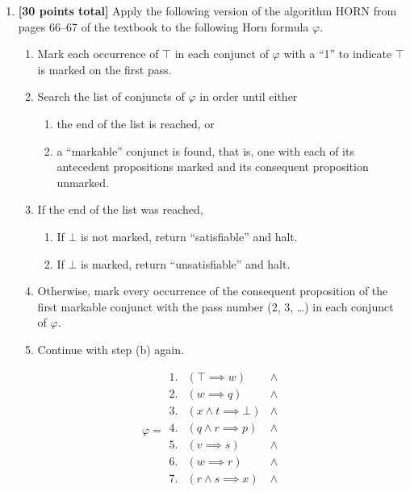 \documentclass{article}
\begin{document}
\begin{enumerate}
\begin{answer}
  \end{answer}

  
\item \textbf{[30 points total]} Apply the following version of the
  algorithm HORN from pages 66--67 of the textbook to the following
  Horn formula $\varphi$.
  \begin{enumerate}
  \item Mark each occurrence of $\top$ in each conjunct of $\varphi$
    with a ``1'' to indicate $\top$ is marked on the first pass.
  \item Search the list of conjuncts of $\varphi$ in order until
    either
    \begin{enumerate}
    \item the end of the list is reached, or
    \item a ``markable'' conjunct is found, that is, one with each of
      its antecedent propositions marked and its consequent
      proposition unmarked.
    \end{enumerate}
  \item If the end of the list was reached,
    \begin{enumerate}
    \item If $\bot$ is not marked, return ``satisfiable'' and halt.
    \item If $\bot$ is marked, return ``unsatisfiable'' and halt.
    \end{enumerate}
  \item Otherwise, mark every occurrence of the consequent proposition
    of the first markable conjunct with the pass number (2, 3, \dots)
    in each conjunct of $\varphi$.
  \item Continue with step (b) again.
  \end{enumerate}
  \begin{displaymath}
    \varphi = 
    \begin{array}{|lll}
      1.  & (\top \implies w)                  & \land \\
      2.  & (w \implies q)                     & \land \\
      3.  & (x \land t \implies \bot)          & \land \\
      4.  & (q \land r \implies p)             & \land \\
      5.  & (v \implies s)                     & \land \\
      6.  & (w \implies r)                     & \land \\
      7.  & (r \land s \implies x)             & \land \\

\end{array}
\end{displaymath}
\end{enumerate}
\end{document}
